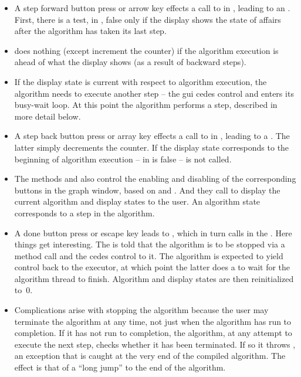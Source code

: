 \begin{itemize}
\item A step forward button press or arrow key effects a call to
   in , leading to an
  . First, there is a test,
   in , false only if the
  display shows the state of affairs after the algorithm has taken its last
  step.

\item {} does nothing (except increment the
   counter) if the algorithm execution is ahead of
  what the display shows (as a result of backward steps).

\item If the display state is current with respect to algorithm
  execution, the algorithm needs to execute another step -- the gui cedes
  control and enters its busy-wait loop. At this point the algorithm performs
  a step, described in more detail below.

\item A step back button press or array key effects a call to
   in , leading to a
  . The latter simply decrements the
   counter. If the display state corresponds to the
  beginning of algorithm execution --  in
   is false --  is not
  called.

\item The methods  and 
  also control the enabling and disabling of the corresponding buttons in the
  graph window, based on  and
  . And they call  to
  display the current algorithm and display states to the user. An algorithm
  state corresponds to a step in the algorithm.

\item A done button press or escape key leads to , which
  in turn calls  in the .
  Here things get interesting. The  is told that
  the algorithm is to be stopped via a  method call and the
   cedes control to it. The algorithm is expected to
  yield control back to the executor, at which point the latter does a
   to wait for the algorithm thread to finish. Algorithm and display
  states are then reinitialized to~0.

\item Complications arise with stopping the algorithm because the user may
  terminate the algorithm at any time, not just when the algorithm has run to
  completion. If it has not run to completion, the algorithm, at any
  attempt to execute the next step, checks whether it has been terminated. If so
  it throws , an exception that is caught at the very end of
  the compiled algorithm. The effect is that of a ``long jump'' to the end of
  the algorithm.
\end{itemize}

